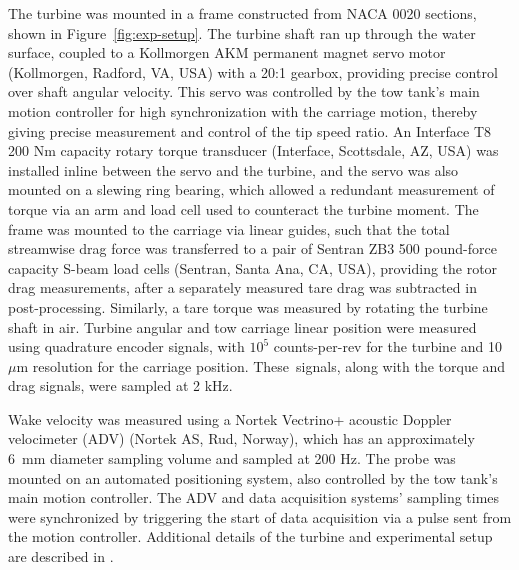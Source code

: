 \documentclass[energies,article,accept,moreauthors,pdftex,10pt,a4paper]{mdpi}
\theoremstyle{mdpi}
\newcounter{ex}
\newcounter{re}
\begin{document}

The turbine was mounted in a frame constructed from NACA 0020 sections, shown in
Figure~\ref{fig:exp-setup}. The turbine shaft ran up through the water surface,
coupled to a Kollmorgen AKM permanent magnet servo motor (Kollmorgen, Radford,
VA, USA) with a 20:1 gearbox, providing precise control over shaft angular
velocity. This servo was controlled by the tow tank's main motion controller for
high synchronization with the carriage motion, thereby giving precise
measurement and control of the tip speed ratio. An Interface T8 200 Nm capacity
rotary torque transducer (Interface, Scottsdale, AZ, USA) was installed inline
between the servo and the turbine, and the servo was also mounted on a slewing
ring bearing, which allowed a redundant measurement of torque via an arm and
load cell used to counteract the turbine moment. The frame was mounted to the
carriage via linear guides, such that the total streamwise drag force was
transferred to a pair of Sentran ZB3 500 pound-force capacity S-beam load cells
(Sentran, Santa Ana, CA, USA), providing the rotor drag measurements, after a
separately measured tare drag was subtracted in post-processing. Similarly, a
tare torque was measured by rotating the turbine shaft in air. Turbine angular
and tow carriage linear position were measured using quadrature encoder signals,
with $10^5$ counts-per-rev for the turbine and 10 ${\mu}$m resolution for the
carriage position. These~signals, along with the torque and drag signals, were
sampled at 2 kHz.

Wake velocity was measured using a Nortek Vectrino+ acoustic Doppler velocimeter
(ADV) (Nortek AS, Rud, Norway), which has an approximately 6~mm diameter
sampling volume and sampled at 200 Hz. The probe was mounted on an automated
positioning system, also controlled by the tow tank's main motion controller.
The ADV and data acquisition systems' sampling times were synchronized by
triggering the start of data acquisition via a pulse sent from the motion
controller. Additional details of the turbine and experimental setup are
described in \cite{Bachant2015-JoT}.
\end{document}
